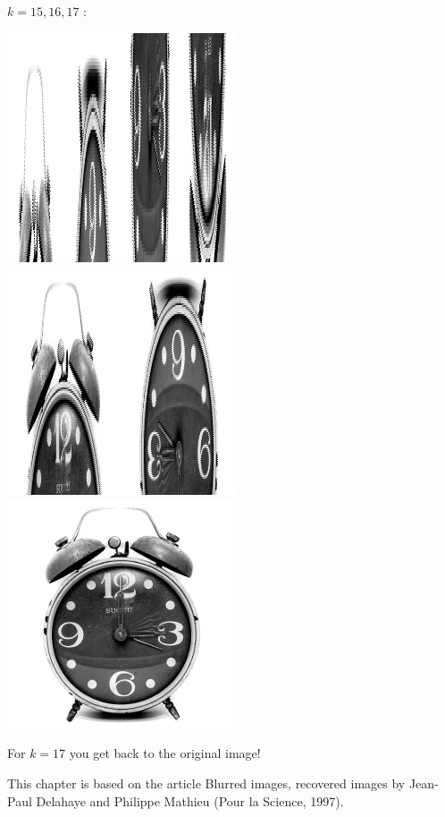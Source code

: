 \documentclass[11pt,class=report,crop=false]{standalone}
\begin{document}
\begin{activite}
$k=15,16,17$ :
\begin{center}
\includegraphics[scale=\myscale,scale=0.4]{images_chapter/clock_gimp_new_baker_15.png}\qquad
\includegraphics[scale=\myscale,scale=0.4]{images_chapter/clock_gimp_new_baker_16.png}\qquad
\includegraphics[scale=\myscale,scale=0.4]{images_chapter/clock_gimp_new_baker_17.png}
\end{center}

For $k=17$ you get back to the original image!

\end{activite}


This chapter is based on the article \og{}Blurred images, recovered images\fg{} by Jean-Paul Delahaye and Philippe Mathieu (Pour la Science, 1997).
\end{document}

